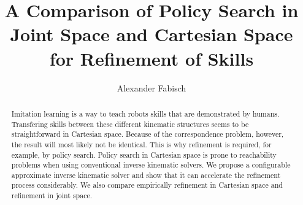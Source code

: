\documentclass{svproc}
\begin{document}
\mainmatter

\title{
A Comparison of Policy Search in Joint Space and Cartesian Space for Refinement of Skills}
\author{Alexander Fabisch}


\maketitle              %

\begin{abstract}
Imitation learning is a way to teach robots skills that are demonstrated by
humans.
Transfering skills between these different kinematic structures
seems to be straightforward in Cartesian space.
Because of the correspondence problem, however, the result will most likely
not be identical.
This is why refinement is required, for example, by policy search.
Policy search in Cartesian space is prone to reachability problems when using
conventional inverse kinematic solvers.
We propose a configurable approximate inverse kinematic solver and show that
it can accelerate the refinement process considerably.
We also compare empirically refinement in Cartesian space and refinement in
joint space.
\end{abstract}
\end{document}
